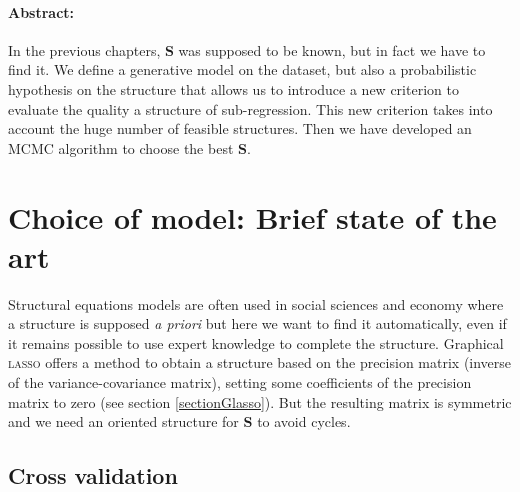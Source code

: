 \documentclass[12pt,a4paper]{report}
\begin{document}
\paragraph{Abstract:} In the previous chapters, $\boldsymbol{S}$ was supposed to be known, but in fact we have to find it. We define a generative model on the dataset, but also a probabilistic hypothesis on the structure that allows us to introduce a new criterion to evaluate the quality a structure of sub-regression. This new criterion takes into account the huge number of feasible structures. Then we have developed an MCMC algorithm to choose the best $\boldsymbol{S}$.%
\section{Choice of model: Brief state of the art}
		Structural equations models are often used in social sciences and economy where a structure is supposed {\it a priori} but here we want to find it automatically, even if it remains possible to use expert knowledge to complete the structure. Graphical \textsc{lasso} offers a method \cite{friedman2008sparse} to obtain a structure based on the precision matrix (inverse of the variance-covariance matrix), setting some coefficients of the precision matrix to zero (see section \ref{sectionGlasso}). But the resulting matrix is symmetric and we need an oriented structure for $\boldsymbol{S}$ to avoid cycles.
			\subsection{Cross validation}
				
\end{document}
